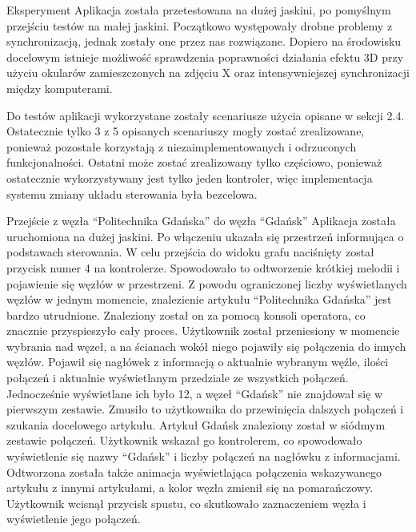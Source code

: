 \begin{chapter}{Eksperyment}
	\newcommand{\chapterPath}{rozdzialy/6_eksperyment}	
Aplikacja została przetestowana na dużej jaskini, po pomyślnym przejściu testów na małej jaskini. Początkowo występowały drobne problemy z synchronizacją, jednak zostały one przez nas rozwiązane. Dopiero na środowisku docelowym istnieje możliwość sprawdzenia poprawności działania efektu 3D przy użyciu okularów zamieszczonych na zdjęciu X oraz intensywniejszej synchronizacji między komputerami. 

Do testów aplikacji wykorzystane zostały scenariusze użycia opisane w sekcji 2.4. Ostatecznie tylko 3 z 5 opisanych scenariuszy mogły zostać zrealizowane, ponieważ pozostałe korzystają z niezaimplementowanych i odrzuconych funkcjonalności. Ostatni może zostać zrealizowany tylko częściowo, ponieważ ostatecznie wykorzystywany jest tylko jeden kontroler, więc implementacja systemu zmiany układu sterowania była bezcelowa.

Przejście z węzła “Politechnika Gdańska” do węzła “Gdańsk” 
Aplikacja została uruchomiona na dużej jaskini. Po włączeniu ukazała się przestrzeń informująca o podstawach sterowania. W celu przejścia do widoku grafu naciśnięty został przycisk numer 4 na kontrolerze. Spowodowało to odtworzenie krótkiej melodii i pojawienie się węzłów w przestrzeni. Z powodu ograniczonej liczby wyświetlanych węzłów w jednym momencie, znalezienie artykułu “Politechnika Gdańska” jest bardzo utrudnione. Znaleziony został on za pomocą konsoli operatora, co znacznie przyspieszyło cały proces. Użytkownik został przeniesiony w momencie wybrania nad węzeł, a na ścianach wokół niego pojawiły się połączenia do innych węzłów. Pojawił się nagłówek z informacją o aktualnie wybranym węźle, ilości połączeń i aktualnie wyświetlanym przedziale ze wszystkich połączeń. Jednocześnie wyświetlane ich było 12, a węzeł “Gdańsk” nie znajdował się w pierwszym zestawie. Zmusiło to użytkownika do przewinięcia dalszych połączeń i szukania docelowego artykułu. Artykuł Gdańsk znaleziony został w siódmym zestawie połączeń. Użytkownik wskazał go kontrolerem, co spowodowało wyświetlenie się nazwy “Gdańsk” i liczby połączeń na nagłówku z informacjami. Odtworzona została także animacja wyświetlająca połączenia wskazywanego artykułu z innymi artykułami, a kolor węzła zmienił się na pomarańczowy. Użytkownik wcisnął przycisk spustu, co skutkowało zaznaczeniem węzła i wyświetlenie jego połączeń.


\end{chapter}
